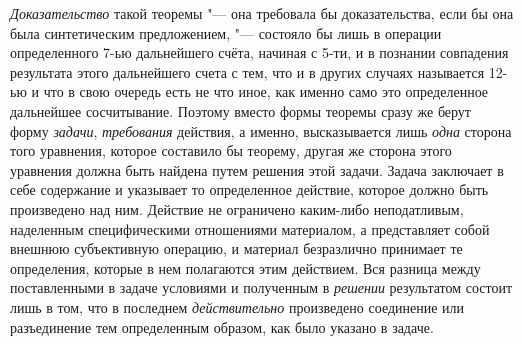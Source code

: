 {\em Доказательство} такой
теоремы "--- она требовала бы доказательства, если бы она была
синтетическим предложением, "--- состояло бы лишь в операции
определенного 7-ью дальнейшего счёта, начиная с 5-ти, и в познании
совпадения результата этого дальнейшего счета с тем, что и в других случаях
называется 12-ью и что в свою очередь есть не что иное, как именно само это
определенное дальнейшее сосчитывание. Поэтому вместо формы теоремы сразу же
берут форму {\em задачи},
{\em требования} действия,
а именно, высказывается лишь {\em одна}
сторона того уравнения, которое составило бы теорему, другая
же сторона этого уравнения должна быть найдена путем решения этой задачи.
Задача заключает в себе содержание и указывает то определенное действие,
которое должно быть произведено над ним. Действие не ограничено каким-либо
неподатливым, наделенным специфическими отношениями материалом, а
представляет собой внешнюю субъективную операцию, и материал безразлично
принимает те определения, которые в нем полагаются этим действием. Вся
разница между поставленными в задаче условиями и полученным в
{\em решении} результатом
состоит лишь в том, что в последнем
{\em действительно}
произведено соединение или разъединение тем определенным
образом, как было указано в задаче.

